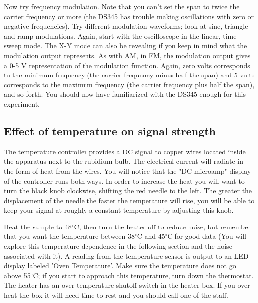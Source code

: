 \documentclass[11pt]{article}
\begin{document}
Now try frequency modulation. Note that you can't set the span to twice the carrier frequency or more (the DS345 has trouble making oscillations with zero or negative frequencies). Try different modulation waveforms; look at sine, triangle and ramp modulations. Again, start with the oscilloscope in the linear, time sweep mode. The X-Y mode can also be revealing if you keep in mind what the modulation output represents. As with AM, in FM, the modulation output gives a 0-5 V representation of the modulation function. Again, zero volts corresponds to the minimum frequency (the carrier frequency minus half the span) and 5 volts corresponds to the maximum frequency (the carrier frequency plus half the span), and so forth. You should now have familiarized with the DS345 enough for this experiment.


\subsection{Effect of temperature on signal strength}
The temperature controller provides a DC signal to copper wires located inside the apparatus next to the rubidium bulb. The electrical current will radiate in the form of heat from the wires. You will notice that the "DC microamp" display of the controller runs both ways. In order to increase the heat you will want to turn the black knob clockwise, shifting the red needle to the left. The greater the displacement of the needle the faster the temperature will rise, you will be able to keep your signal at roughly a constant temperature by adjusting this knob. 

Heat the sample to 48$^\circ$C, then turn the heater off to reduce noise, but remember that you want the temperature between 38$^\circ$C and 45$^\circ$C for good data (You will explore this temperature dependence in the following section and the noise associated with it). A reading from the temperature sensor is output to an LED display labeled 'Oven Temperature'. Make sure the temperature does not go above 55$^\circ$C; if you start to approach this temperature, turn down the thermostat. The heater has an over-temperature shutoff switch in the heater box. If you over heat the box it will need time to rest and you should call one of the staff.
\end{document}
